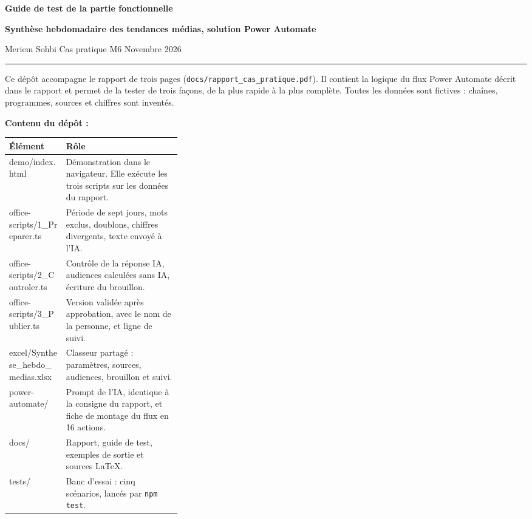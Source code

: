 \documentclass[10pt,a4paper]{article}
\newcommand{\cadre}[1]{\textbf{\color{ardoise}#1 :}}
\begin{document}
{\LARGE\bfseries Guide de test de la partie fonctionnelle\par}
\vspace{1pt}
{\bfseries Synthèse hebdomadaire des tendances médias, solution Power Automate\par}
\vspace{1pt}
{\small\color{muted}Meriem Sohbi \textperiodcentered{} Cas pratique M6 \textperiodcentered{} Novembre 2026\par}
\vspace{3pt}
{\color{teal}\rule{\linewidth}{1.2pt}}\par\vspace{6pt}

Ce dépôt accompagne le rapport de trois pages (\texttt{docs/rapport\_cas\_pratique.pdf}). Il contient la logique du flux Power Automate décrit dans le rapport et permet de la tester de trois façons, de la plus rapide à la plus complète. Toutes les données sont fictives : chaînes, programmes, sources et chiffres sont inventés.

\cadre{Contenu du dépôt}\par\vspace{1pt}
{\small
\begin{tabularx}{\linewidth}{>{\raggedright\arraybackslash\ttfamily}p{0.33\linewidth}L}
\toprule
\normalfont\textbf{Élément} & \textbf{Rôle}\\
\midrule
demo/index.html & Démonstration dans le navigateur. Elle exécute les trois scripts sur les données du rapport.\\
office-scripts/1\_Preparer.ts & Période de sept jours, mots exclus, doublons, chiffres divergents, texte envoyé à l’IA.\\
office-scripts/2\_Controler.ts & Contrôle de la réponse IA, audiences calculées sans IA, écriture du brouillon.\\
office-scripts/3\_Publier.ts & Version validée après approbation, avec le nom de la personne, et ligne de suivi.\\
excel/Synthese\_hebdo\_medias.xlsx & Classeur partagé : paramètres, sources, audiences, brouillon et suivi.\\
power-automate/ & Prompt de l’IA, identique à la consigne du rapport, et fiche de montage du flux en 16 actions.\\
docs/ & Rapport, guide de test, exemples de sortie et sources LaTeX.\\
tests/ & Banc d’essai : cinq scénarios, lancés par \texttt{npm test}.\\
\bottomrule
\end{tabularx}}
\end{document}
